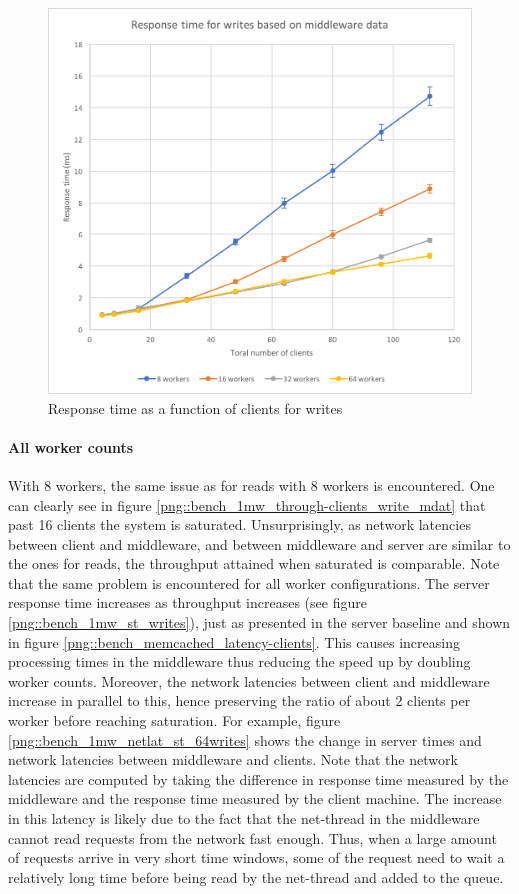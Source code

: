 \documentclass[11pt,a4paper]{article}
\begin{document}
\begin{figure}[!h]
\begin{minipage}[b]{.45\textwidth}
        \includegraphics[width=\textwidth]{processing/graphics/bench_1mw_latency-clients_write_mdat.png}
        \caption{Response time as a function of clients for writes}
        \label{png::bench_1mw_latency-clients_write_mdat}
    \end{minipage}
\end{figure}

\paragraph{All worker counts}
With 8 workers, the same issue as for reads with 8 workers is encountered. One can clearly see in figure \ref{png::bench_1mw_through-clients_write_mdat} that past 16 clients the system is saturated. Unsurprisingly, as network latencies between client and middleware, and between middleware and server are similar to the ones for reads, the throughput attained when saturated is comparable. Note that the same problem is encountered for all worker configurations. The server response time increases as throughput increases (see figure \ref{png::bench_1mw_st_writes}), just as presented in the server baseline and shown in figure \ref{png::bench_memcached_latency-clients}. This causes increasing processing times in the middleware thus reducing the speed up by doubling worker counts. Moreover, the network latencies between client and middleware increase in parallel to this, hence preserving the ratio of about 2 clients per worker before reaching saturation. For example, figure \ref{png::bench_1mw_netlat_st_64writes} shows the change in server times and network latencies between middleware and clients. Note that the network latencies are computed by taking the difference in response time measured by the middleware and the response time measured by the client machine. The increase in this latency is likely due to the fact that the net-thread in the middleware cannot read requests from the network fast enough. Thus, when a large amount of requests arrive in very short time windows, some of the request need to wait a relatively long time before being read by the net-thread and added to the queue.
\end{document}
